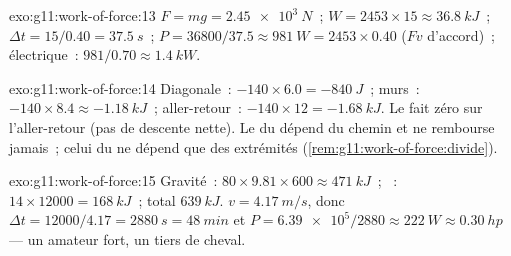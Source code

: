 \begin{solution}{exo:g11:work-of-force:13}
$F = mg = \qty{2.45e3}{N}$~; $W = 2453 \times 15 \approx \qty{36.8}{kJ}$~;
$\Delta t = 15/0.40 = \qty{37.5}{s}$~;
$P = 36800/37.5 \approx \qty{981}{W} = 2453 \times 0.40$ ($Fv$
d'accord)~; électrique~: $981/0.70 \approx \qty{1.4}{kW}$.
\end{solution}

\begin{solution}{exo:g11:work-of-force:14}
Diagonale~: $-140 \times 6.0 = -\qty{840}{J}$~; murs~:
$-140 \times 8.4 \approx -\qty{1.18}{kJ}$~; aller-retour~:
$-140 \times 12 = -\qty{1.68}{kJ}$. Le
 fait zéro sur l'aller-retour
(pas de descente nette). Le  du
 dépend du chemin et ne rembourse
jamais~; celui du  ne dépend
que des extrémités (\cref{rem:g11:work-of-force:divide}).
\end{solution}

\begin{solution}{exo:g11:work-of-force:15}
Gravité~: $80 \times 9.81 \times 600 \approx \qty{471}{kJ}$~;
~: $14 \times 12000 = \qty{168}{kJ}$~;
total $\qty{639}{kJ}$. $v = \qty{4.17}{m/s}$, donc
$\Delta t = 12000/4.17 = \qty{2880}{s} = \qty{48}{min}$ et
$P = \num{6.39e5}/2880 \approx \qty{222}{W} \approx \qty{0.30}{hp}$ ---
un amateur fort, un tiers de cheval.
\end{solution}

